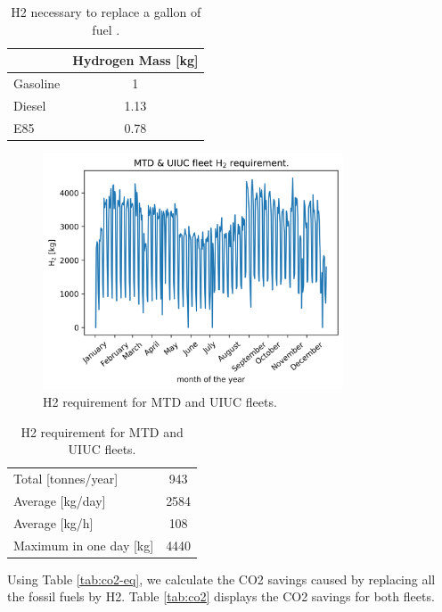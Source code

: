 	\begin{table}[htbp!]
	\centering
	\caption{\gls{H2} necessary to replace a gallon of fuel \cite{doe_office_of_energy_efficiency_and_renewable_energy_hydrogen_2020} \cite{alternative_fuels_data_center_fuel_2014}.}
	\begin{tabular}{l|c}
	    \hline
	 	                 & Hydrogen Mass [kg] \\ \hline
	 	Gasoline         & 1                  \\
	 	Diesel           & 1.13               \\
	 	E85              & 0.78               \\ \hline
	\end{tabular}
	\label{tab:equiv}
	\end{table}

	\begin{figure}[htbp!]
	    \centering
		\includegraphics[height=7.0cm]{figures-hydro/hydro-fleet}
		\hfill
		\caption{\gls{H2} requirement for MTD and UIUC fleets.}
		\label{fig:hydro-fleet}
	\end{figure}

	\begin{table}[htbp!]
		\centering
	    \caption{\gls{H2} requirement for MTD and UIUC fleets.}
		\begin{tabular}{l|c}
		\hline
		Total [tonnes/year]     & 943    \\
		Average [kg/day] 	    & 2584   \\
		Average [kg/h] 		    & 108    \\
		Maximum in one day [kg] & 4440   \\ \hline
        \end{tabular}
        \label{tab:hydro-fleet}
	\end{table}

Using Table \ref{tab:co2-eq}, we calculate the \gls{CO2} savings caused by replacing all the fossil fuels by \gls{H2}.
Table \ref{tab:co2} displays the \gls{CO2} savings for both fleets.

